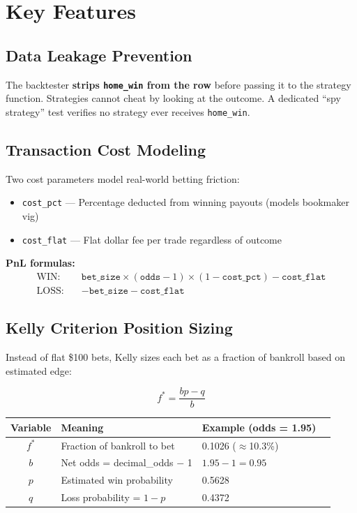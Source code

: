 \documentclass[11pt,a4paper]{article}
\begin{document}
\section{Key Features}

\subsection{Data Leakage Prevention}

The backtester \textbf{strips \texttt{home\_win} from the row} before passing it to the strategy function. Strategies cannot cheat by looking at the outcome. A dedicated ``spy strategy'' test verifies no strategy ever receives \texttt{home\_win}.

\subsection{Transaction Cost Modeling}

Two cost parameters model real-world betting friction:
\begin{itemize}[nosep]
    \item \texttt{cost\_pct} --- Percentage deducted from winning payouts (models bookmaker vig)
    \item \texttt{cost\_flat} --- Flat dollar fee per trade regardless of outcome
\end{itemize}

\textbf{PnL formulas:}
\begin{align*}
\text{WIN:} \quad & \texttt{bet\_size} \times (\texttt{odds} - 1) \times (1 - \texttt{cost\_pct}) - \texttt{cost\_flat} \\
\text{LOSS:} \quad & -\texttt{bet\_size} - \texttt{cost\_flat}
\end{align*}

\subsection{Kelly Criterion Position Sizing}

Instead of flat \$100 bets, Kelly sizes each bet as a fraction of bankroll based on estimated edge:

\[
f^* = \frac{bp - q}{b}
\]

\begin{table}[h]
\centering
\begin{tabular}{@{}clll@{}}
\toprule
\textbf{Variable} & \textbf{Meaning} & \textbf{Example (odds = 1.95)} \\
\midrule
$f^*$ & Fraction of bankroll to bet & 0.1026 ($\approx$10.3\%) \\
$b$ & Net odds = decimal\_odds $-$ 1 & $1.95 - 1 = 0.95$ \\
$p$ & Estimated win probability & 0.5628 \\
$q$ & Loss probability = $1 - p$ & 0.4372 \\
\bottomrule
\end{tabular}
\end{table}
\end{document}
